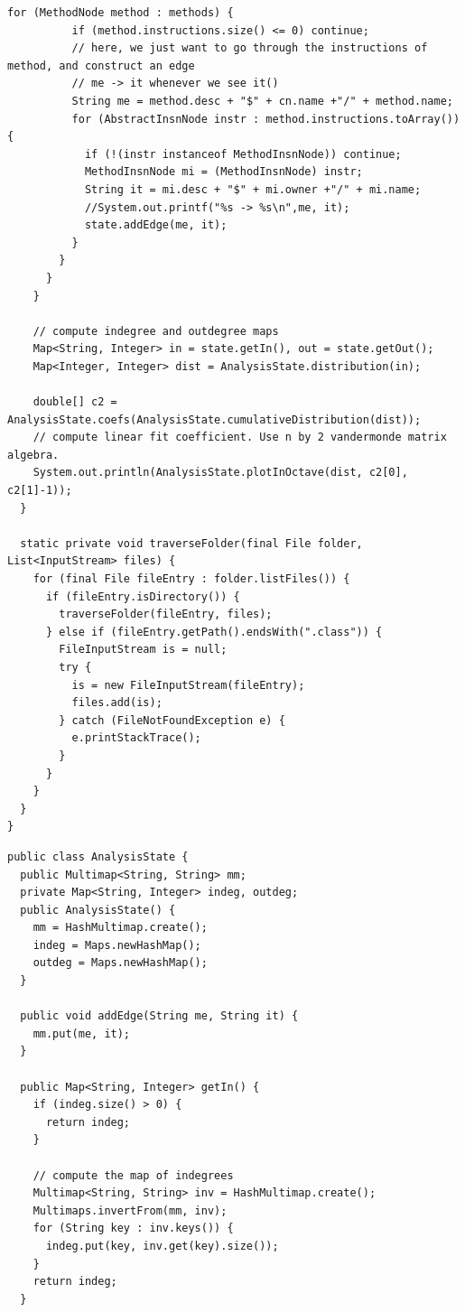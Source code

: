 \documentclass[11pt,a4paper,twocolumn]{article}
\begin{document}
\begin{singlespace}
\begin{appendices}
\begin{lstlisting}[caption={Main.java}]
        for (MethodNode method : methods) {
          if (method.instructions.size() <= 0) continue;
          // here, we just want to go through the instructions of method, and construct an edge
          // me -> it whenever we see it()
          String me = method.desc + "$" + cn.name +"/" + method.name;
          for (AbstractInsnNode instr : method.instructions.toArray()) {
            if (!(instr instanceof MethodInsnNode)) continue;
            MethodInsnNode mi = (MethodInsnNode) instr;
            String it = mi.desc + "$" + mi.owner +"/" + mi.name;
            //System.out.printf("%s -> %s\n",me, it);
            state.addEdge(me, it);
          }
        }
      }
    }

    // compute indegree and outdegree maps
    Map<String, Integer> in = state.getIn(), out = state.getOut();
    Map<Integer, Integer> dist = AnalysisState.distribution(in);

    double[] c2 = AnalysisState.coefs(AnalysisState.cumulativeDistribution(dist));
    // compute linear fit coefficient. Use n by 2 vandermonde matrix algebra.
    System.out.println(AnalysisState.plotInOctave(dist, c2[0], c2[1]-1));
  }

  static private void traverseFolder(final File folder, List<InputStream> files) {
    for (final File fileEntry : folder.listFiles()) {
      if (fileEntry.isDirectory()) {
        traverseFolder(fileEntry, files);
      } else if (fileEntry.getPath().endsWith(".class")) {
        FileInputStream is = null;
        try {
          is = new FileInputStream(fileEntry);
          files.add(is);
        } catch (FileNotFoundException e) {
          e.printStackTrace();
        }
      }
    }
  }
}
\end{lstlisting}
\begin{lstlisting}[caption={AnalysisState.java}]
public class AnalysisState {
  public Multimap<String, String> mm;
  private Map<String, Integer> indeg, outdeg;
  public AnalysisState() {
    mm = HashMultimap.create();
    indeg = Maps.newHashMap();
    outdeg = Maps.newHashMap();
  }

  public void addEdge(String me, String it) {
    mm.put(me, it);
  }

  public Map<String, Integer> getIn() {
    if (indeg.size() > 0) {
      return indeg;
    }

    // compute the map of indegrees
    Multimap<String, String> inv = HashMultimap.create();
    Multimaps.invertFrom(mm, inv);
    for (String key : inv.keys()) {
      indeg.put(key, inv.get(key).size());
    }
    return indeg;
  }


\end{lstlisting}
\end{appendices}
\end{singlespace}
\end{document}
